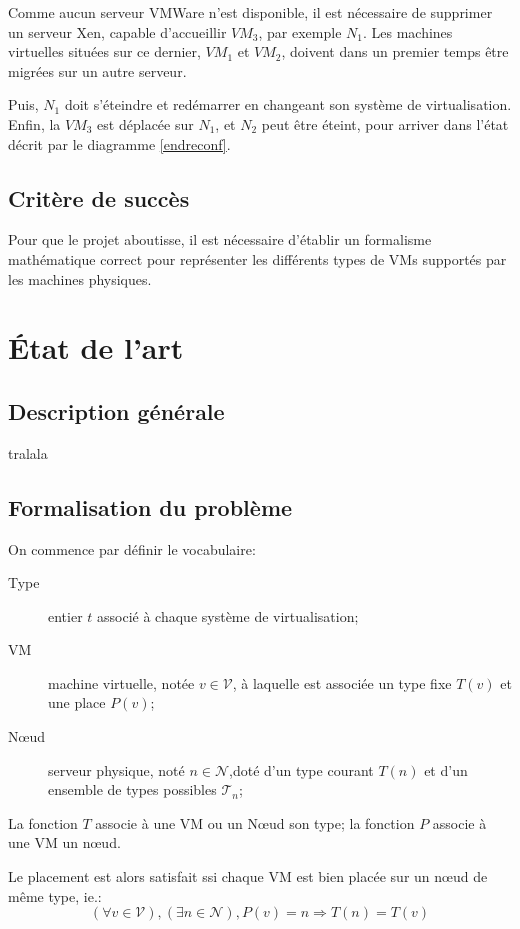 \documentclass[a4paper]{article}
\begin{document}
Comme aucun serveur VMWare n'est disponible, il est nécessaire de supprimer
un serveur Xen, capable d'accueillir $VM_3$, par exemple $N_1$. Les machines
virtuelles situées sur ce dernier, $VM_1$ et $VM_2$,  doivent dans un premier
temps être migrées sur un autre serveur.

Puis, $N_1$ doit s'éteindre et redémarrer en changeant son système
de virtualisation. Enfin, la $VM_3$ est déplacée sur $N_1$, et $N_2$ peut
être éteint, pour arriver dans l'état décrit par le diagramme \ref{endreconf}.

\subsection{Critère de succès}
Pour que le projet aboutisse, il est nécessaire d'établir un
formalisme mathématique correct pour représenter les différents
types de VMs supportés par les machines physiques.

\section{État de l'art}
\subsection{Description générale}
tralala
\subsection{Formalisation du problème}
On commence par définir le vocabulaire:
\begin{description}
	\item[Type] entier $t$ associé à chaque système de virtualisation;
	\item[VM] machine virtuelle, notée $v \in \mathcal V$, à laquelle
		est associée un type fixe $T(v)$ et une place $P(v)$;
	\item[Nœud] serveur physique, noté $n \in \mathcal N$,doté d'un
		type courant $T(n)$ et d'un ensemble de types possibles
		$\mathcal{T}_n$;
\end{description}


La fonction $T$ associe à une VM ou un Nœud son type; la fonction $P$
associe à une VM un nœud.

Le placement est alors satisfait ssi chaque VM est bien placée sur
un nœud de même type, ie.:
\[
	(\forall v \in \mathcal V), (\exists n \in \mathcal N), P(v) = n
		\Rightarrow T(n) = T(v)	
\]
\end{document}
